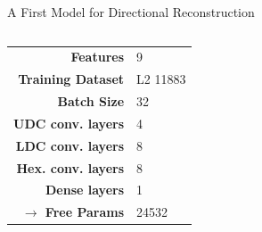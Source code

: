 \begin{frame}{A First Model for Directional Reconstruction}
    \begin{columns}
        \begin{column}{.35\textwidth}
            \begin{tabular}{>{\small\bf}r l}
                \toprule
                Features                  & 9         \\
                Training Dataset          & L2 11883  \\
                Batch Size                & 32        \\
                UDC conv. layers          & 4         \\
                LDC conv. layers          & 8         \\
                Hex. conv. layers         & 8         \\
                Dense layers              & 1\times50 \\
                $\rightarrow$ Free Params & 24532     \\
                \bottomrule
            \end{tabular}
        \end{column}
        \begin{column}{.65\textwidth}
            \begin{figure}
                \centering
\end{figure}
\end{column}
\end{columns}
\end{frame}
